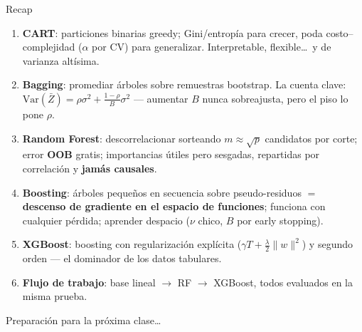 \documentclass{beamer}
\newcommand{\Var}{\mathrm{Var}}
\newcommand{\1}{\mathbb{I}}
\begin{document}
\begin{frame}{Recap}
\small
\begin{enumerate}\itemsep6pt
  \item \textbf{CART}: particiones binarias greedy; Gini/entropía para crecer, poda costo--complejidad ($\alpha$ por CV) para generalizar. Interpretable, flexible\ldots\ y de varianza altísima.
  \item \textbf{Bagging}: promediar árboles sobre remuestras bootstrap. La cuenta clave: $\Var(\bar{Z}) = \rho\sigma^2 + \frac{1-\rho}{B}\sigma^2$ --- aumentar $B$ nunca sobreajusta, pero el piso lo pone $\rho$.
  \item \textbf{Random Forest}: descorrelacionar sorteando $m \approx \sqrt{p}$ candidatos por corte; error \textbf{OOB} gratis; importancias útiles pero sesgadas, repartidas por correlación y \textbf{jamás causales}.
  \item \textbf{Boosting}: árboles pequeños en secuencia sobre pseudo-residuos $=$ \textbf{descenso de gradiente en el espacio de funciones}; funciona con cualquier pérdida; aprender despacio ($\nu$ chico, $B$ por early stopping).
  \item \textbf{XGBoost}: boosting con regularización explícita ($\gamma T + \frac{\lambda}{2}\|w\|^2$) y segundo orden --- el dominador de los datos tabulares.
  \item \textbf{Flujo de trabajo}: base lineal $\rightarrow$ RF $\rightarrow$ XGBoost, todos evaluados en la misma prueba.
\end{enumerate}
\end{frame}

\begin{frame}
\vspace{2.0cm}
\Large{Preparación para la próxima clase\ldots}
\end{frame}

\end{document}
